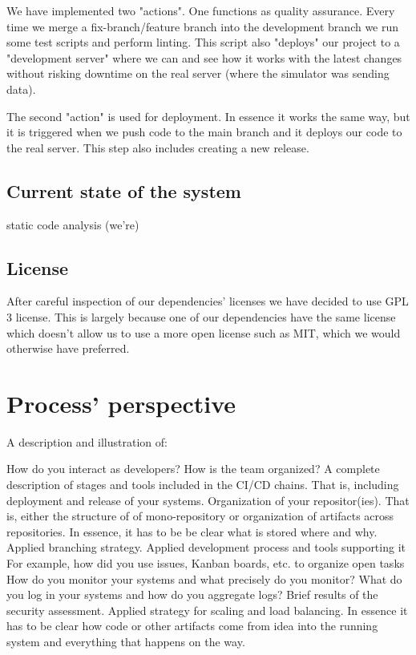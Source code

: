 \documentclass[12pt]{article}
\begin{document}
We have implemented two "actions". One functions as quality assurance. Every time we merge a fix-branch/feature branch into the development branch we  run some test scripts and perform linting. This script also "deploys" our project to a "development server" where we can and see how it works with the latest changes without risking downtime on the real server (where the simulator was sending data).

The second "action" is used for deployment. In essence it works the same way, but it is triggered when we push code to the main branch and it deploys our code to the real server. This step also includes creating a new release.

\subsection{Current state of the system}
static code analysis (we're)

\subsection{License}
After careful inspection of our dependencies' licenses we have decided to use GPL 3 license. This is largely because one of our dependencies have the same license which doesn't allow us to use a more open license such as MIT, which we would otherwise have preferred.



\section{Process' perspective}
A description and illustration of:

How do you interact as developers?
How is the team organized?
A complete description of stages and tools included in the CI/CD chains.
That is, including deployment and release of your systems.
Organization of your repositor(ies).
That is, either the structure of of mono-repository or organization of artifacts across repositories.
In essence, it has to be be clear what is stored where and why.
Applied branching strategy.
Applied development process and tools supporting it
For example, how did you use issues, Kanban boards, etc. to organize open tasks
How do you monitor your systems and what precisely do you monitor?
What do you log in your systems and how do you aggregate logs?
Brief results of the security assessment.
Applied strategy for scaling and load balancing.
In essence it has to be clear how code or other artifacts come from idea into the running system and everything that happens on the way.
\end{document}
